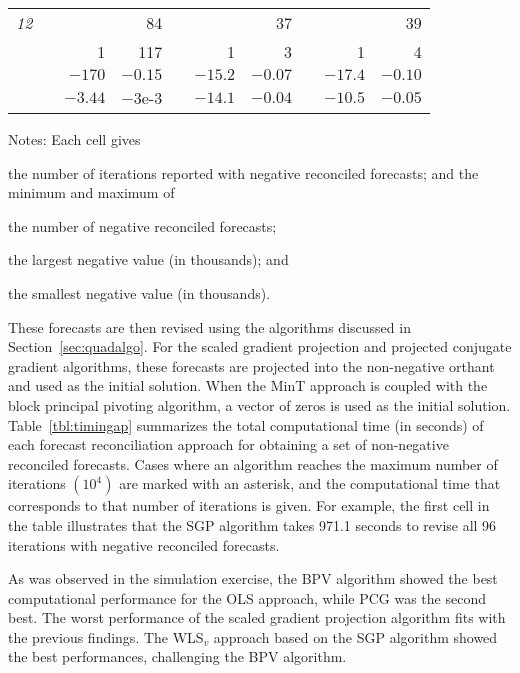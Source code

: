 \documentclass[11pt]{article}
\newcommand{\0}{\phantom{0}}
\begin{document}
\begin{table}[ht]
\begin{threeparttable}
\begin{tabular}{lrrrrrrrrr}
			{\it 12} & & & 84 & & & 37 & & & 39 \\
			& & 1 & 117 & & 1 & 3 & & 1 & 4 \\
			& & $-170$ & $-0.15$ & & $-15.2$ & $-0.07$ & & $-17.4$ & $-0.10$ \\
			& & $-3.44$ & $-3$e-3 & & $-14.1$ & $-0.04$ & & $-10.5$ & $-0.05$ \\
			\bottomrule
		\end{tabular}
		\begin{tablenotes}
			\item [] Notes: Each cell gives \begin{inparaenum}[(i)] \item the number of iterations reported with negative reconciled forecasts; and the minimum and maximum of \item the number of negative reconciled forecasts; \item the largest negative value (in thousands); and \item the smallest negative value (in thousands). \end{inparaenum}
		\end{tablenotes}
	\end{threeparttable}
\end{table}

These forecasts are then revised using the algorithms discussed in Section~\ref{sec:quadalgo}. For the scaled gradient projection and projected conjugate gradient algorithms, these forecasts are projected into the non-negative orthant and used as the initial solution. When the MinT approach is coupled with the block principal pivoting algorithm, a vector of zeros is used as the initial solution. Table~\ref{tbl:timingap} summarizes the total computational time (in seconds) of each forecast reconciliation approach for obtaining a set of non-negative reconciled forecasts. Cases where an algorithm reaches the maximum number of iterations $(10^{4})$ are marked with an asterisk, and the computational time that corresponds to that number of iterations is given. For example, the first cell in the table illustrates that the SGP algorithm takes 971.1 seconds to revise all 96 iterations with negative reconciled forecasts.

As was observed in the simulation exercise, the BPV algorithm showed the best computational performance for the OLS approach, while PCG was the second best. The worst performance of the scaled gradient projection algorithm fits with the previous findings. The WLS$_{v}$ approach based on the SGP algorithm showed the best performances, challenging the BPV algorithm.
\end{document}
